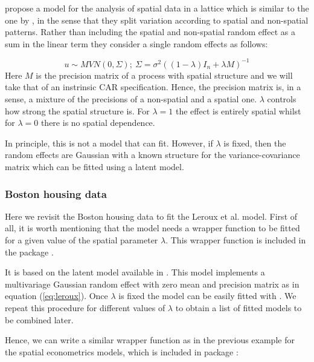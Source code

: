 \documentclass[article]{jss}
\begin{document}
\citet{Lerouxetal:1999} propose a model for the analysis of spatial data in a
lattice which is similar to the one by \citet{besagetal:1991}, in the sense
that they split variation according to  spatial and non-spatial patterns.
Rather than including the spatial and non-spatial random effect as a sum in the
linear term they consider a single random effects as follows:

\begin{equation}
u \sim MVN(0, \Sigma);\ \Sigma=\sigma^2 ((1-\lambda) I_n+\lambda M)^{-1}
\label{eq:leroux}
\end{equation}
\noindent
Here $M$ is the precision matrix of a process with spatial structure and we
will take that of an instrinsic CAR specification. Hence, the precision matrix
is, in a sense, a mixture of the precisions of a non-spatial and a spatial
one. $\lambda$ controls how strong the spatial structure is. For $\lambda=1$
the effect is entirely spatial whilst for $\lambda=0$ there is no spatial
dependence.

In principle, this is not a model that  can fit. However, if
$\lambda$ is fixed, then the random effects are Gaussian with a known structure
for the variance-covariance matrix which can be fitted using a 
latent model.

\subsubsection{Boston housing data}

Here we revisit the Boston housing data to fit the Leroux et al. model.  First
of all, it is worth mentioning that the model needs a wrapper function to be
fitted for a given value of the spatial parameter $\lambda$. This
wrapper function is included in the  package .

It is based on the  latent model available in  .
This model implements a multivariage Gaussian random effect with zero mean and
precision matrix as in equation (\ref{eq:leroux}). Once $\lambda$ is fixed the
model can be easily fitted with .  We repeat this procedure for
different values of $\lambda$ to obtain a list of fitted models to be combined
later.

Hence, we can write a similar wrapper function as in the previous example for
the spatial econometrics models, which is included in package :
\end{document}
